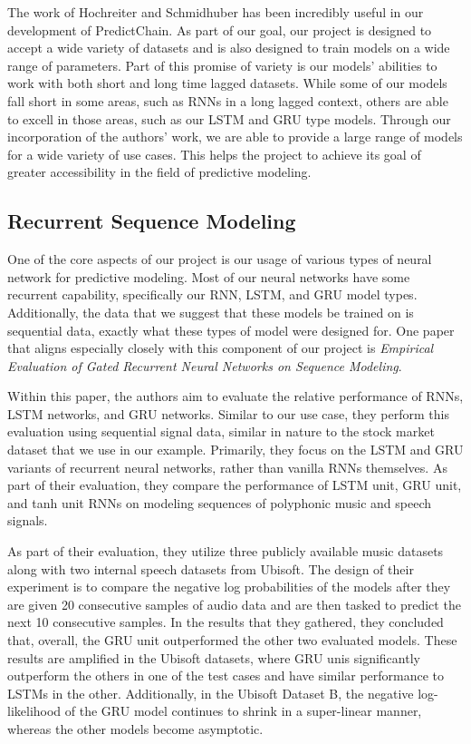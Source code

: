\documentclass{article}
\begin{document}
    The work of Hochreiter and Schmidhuber has been incredibly useful in our development of PredictChain.  As part of
    our goal, our project is designed to accept a wide variety of datasets and is also designed to train models on
    a wide range of parameters.  Part of this promise of variety is our models' abilities to work with both short
    and long time lagged datasets.  While some of our models fall short in some areas, such as RNNs in a long lagged
    context, others are able to excell in those areas, such as our LSTM and GRU type models.  Through our incorporation
    of the authors' work, we are able to provide a large range of models for a wide variety of use cases.  This helps
    the project to achieve its goal of greater accessibility in the field of predictive modeling.


    \subsection{Recurrent Sequence Modeling}

    One of the core aspects of our project is our usage of various types of neural network for predictive modeling.
    Most of our neural networks have some recurrent capability, specifically our RNN, LSTM, and GRU model types.
    Additionally, the data that we suggest that these models be trained on is sequential data, exactly what these
    types of model were designed for.  One paper that aligns especially closely with this component of our project
    is \textit{Empirical Evaluation of Gated Recurrent Neural Networks on Sequence Modeling}\cite{recurrentModeling}.

    Within this paper, the authors aim to evaluate the relative performance of RNNs, LSTM networks, and GRU networks.
    Similar to our use case, they perform this evaluation using sequential signal data, similar in nature to the
    stock market dataset that we use in our example.  Primarily, they focus on the LSTM and GRU variants of
    recurrent neural networks, rather than vanilla RNNs themselves.  As part of their evaluation, they compare
    the performance of LSTM unit, GRU unit, and tanh unit RNNs on modeling sequences of polyphonic music and
    speech signals.

    As part of their evaluation, they utilize three publicly available music datasets along with two internal speech
    datasets from Ubisoft.  The design of their experiment is to compare the negative log probabilities of the models
    after they are given 20 consecutive samples of audio data and are then tasked to predict the next 10 consecutive
    samples.  In the results that they gathered, they concluded that, overall, the GRU unit outperformed the other
    two evaluated models.  These results are amplified in the Ubisoft datasets, where GRU unis significantly
    outperform the others in one of the test cases and have similar performance to LSTMs in the other.  Additionally,
    in the Ubisoft Dataset B, the negative log-likelihood of the GRU model continues to shrink in a super-linear manner,
    whereas the other models become asymptotic.
\end{document}
